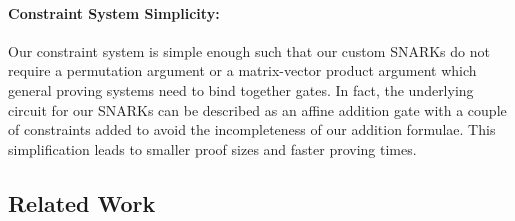 \vspace{-0.05in}
\paragraph{Constraint System Simplicity:} Our constraint system is simple enough such that our custom SNARKs do not require a permutation argument or a matrix-vector product 
argument which general proving systems need to bind together gates. In fact, the underlying circuit for our SNARKs can be described as an affine addition gate with a couple of 
constraints added to avoid the incompleteness of our addition formulae. This simplification leads to smaller proof sizes  and faster proving times.

\vspace{-0.2cm}
\subsection{Related Work}

